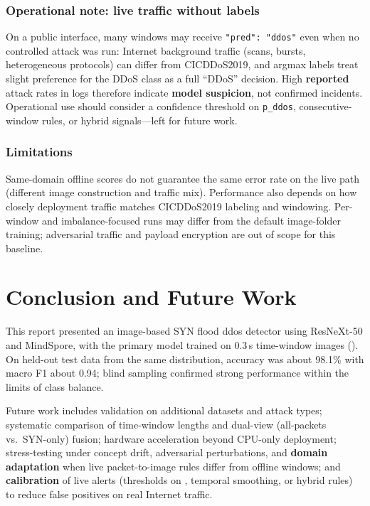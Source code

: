 \subsection{Operational note: live traffic without labels}
On a public interface, many windows may receive \texttt{"pred": "ddos"} even when
no controlled attack was run: Internet background traffic (scans, bursts,
heterogeneous protocols) can differ from CICDDoS2019, and argmax labels treat
slight preference for the DDoS class as a full ``DDoS'' decision. High
\textbf{reported} attack rates in logs therefore indicate \textbf{model
suspicion}, not confirmed incidents. Operational use should consider a
confidence threshold on \texttt{p\_ddos}, consecutive-window rules, or hybrid
signals---left for future work.

\subsection{Limitations}
Same-domain offline scores do not guarantee the same error rate on the live
path (different image construction and traffic mix). Performance also depends on how closely
deployment traffic matches CICDDoS2019 labeling and windowing.
Per-window and imbalance-focused runs may differ from the default image-folder
training; adversarial traffic and payload encryption are out of scope for this
baseline.


\chapter{Conclusion and Future Work}
\label{ch:conc}

This report presented an image-based SYN flood \gls{ddos} detector using
ResNeXt-50 and MindSpore, with the primary model trained on 0.3\,s time-window
images (). On held-out test data from the
same distribution, accuracy was about 98.1\% with macro F1 about 0.94; blind
sampling confirmed strong performance within the limits of class balance.

Future work includes validation on additional datasets and attack types;
systematic comparison of time-window lengths and dual-view (all-packets vs.\
SYN-only) fusion; hardware acceleration beyond CPU-only deployment;
stress-testing under concept drift, adversarial perturbations, and
\textbf{domain adaptation} when live packet-to-image rules differ from offline
windows; and \textbf{calibration} of live alerts (thresholds on
, temporal smoothing, or hybrid rules) to reduce false positives
on real Internet traffic.


